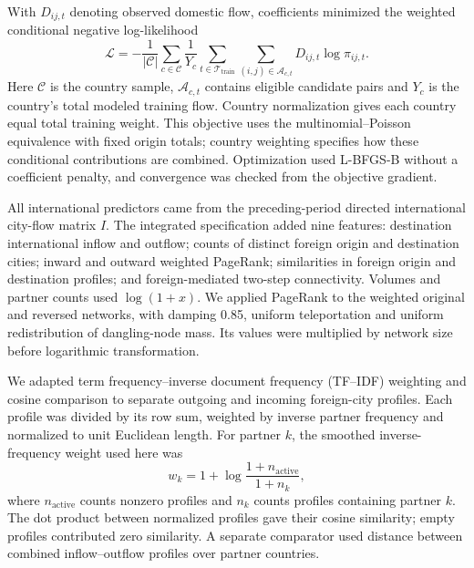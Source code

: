 With $D_{ij,t}$ denoting observed domestic flow, coefficients minimized the weighted conditional negative log-likelihood
\begin{equation*}
\mathcal{L}=-\frac{1}{|\mathcal{C}|}
\sum_{c\in\mathcal{C}}\frac{1}{Y_c}
\sum_{t\in\mathcal{T}_{\mathrm{train}}}
\sum_{(i,j)\in\mathcal{A}_{c,t}}D_{ij,t}\log\pi_{ij,t}.
\end{equation*}
Here $\mathcal{C}$ is the country sample, $\mathcal{A}_{c,t}$ contains eligible candidate pairs and $Y_c$ is the country's total modeled training flow. Country normalization gives each country equal total training weight. This objective uses the multinomial--Poisson equivalence\cite{baker1994} with fixed origin totals; country weighting specifies how these conditional contributions are combined. Optimization used L-BFGS-B\cite{byrd1995} without a coefficient penalty, and convergence was checked from the objective gradient.

All international predictors came from the preceding-period directed international city-flow matrix $I$. The integrated specification added nine features: destination international inflow and outflow; counts of distinct foreign origin and destination cities; inward and outward weighted PageRank; similarities in foreign origin and destination profiles; and foreign-mediated two-step connectivity. Volumes and partner counts used $\log(1+x)$. We applied PageRank\cite{brin1998} to the weighted original and reversed networks, with damping 0.85, uniform teleportation and uniform redistribution of dangling-node mass. Its values were multiplied by network size before logarithmic transformation.

We adapted term frequency--inverse document frequency (TF--IDF) weighting and cosine comparison\cite{salton1988} to separate outgoing and incoming foreign-city profiles. Each profile was divided by its row sum, weighted by inverse partner frequency and normalized to unit Euclidean length. For partner $k$, the smoothed inverse-frequency weight used here was
\begin{equation*}
w_k=1+\log\frac{1+n_{\mathrm{active}}}{1+n_k},
\end{equation*}
where $n_{\mathrm{active}}$ counts nonzero profiles and $n_k$ counts profiles containing partner $k$. The dot product between normalized profiles gave their cosine similarity; empty profiles contributed zero similarity. A separate comparator used distance between combined inflow--outflow profiles over partner countries.

